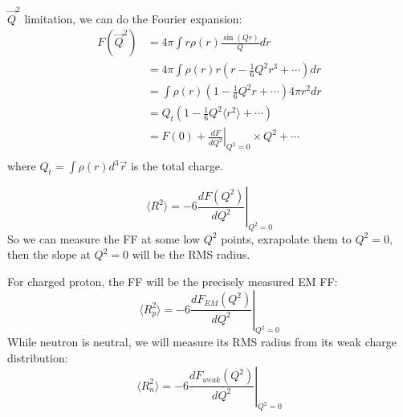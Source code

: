 $\vec{Q}^2$ limitation, we can do the Fourier expansion:
\begin{equation*}
    \begin{aligned}
	F(\vec{Q}^2) &= 4\pi \int r \rho(r) \frac{\sin{(Qr)}}{Q} dr \\
	    &= 4\pi \int \rho(r) r \left( r - \frac{1}{6} Q^2r^3 + \cdots \right) dr	\\
	    &= \int \rho(r)  \left( 1 - \frac{1}{6} Q^2r + \cdots \right) 4\pi r^2 dr	\\
	    &= Q_t (1 - \frac{1}{6}Q^2\langle r^2 \rangle + \cdots) \\
	    &= F(0) + \left.\frac{dF}{dQ^2}\right|_{Q^2=0} \times Q^2 + \cdots	\\
    \end{aligned}
\end{equation*}
where $Q_t = \int \rho(r) d^3\vec{r}$ is the total charge.

\begin{equation}
    \langle R^2 \rangle = -6 \left. \frac{dF(Q^2)}{dQ^2} \right|_{Q^2 = 0}
\end{equation}
So we can measure the FF at some low $Q^2$ points, exrapolate them 
to $Q^2 = 0$, then the slope at $Q^2 = 0$ will be the RMS radius.

For charged proton, the FF will be the precisely measured EM FF:
\begin{equation}
    \langle R_p^2 \rangle = -6 \left. \frac{dF_{EM}(Q^2)}{dQ^2} \right|_{Q^2 = 0}
\end{equation}
While neutron is neutral, we will measure its RMS radius from its weak charge
distribution:
\begin{equation}
    \langle R_n^2 \rangle = -6 \left. \frac{dF_{weak}(Q^2)}{dQ^2} \right|_{Q^2 = 0}
\end{equation}

